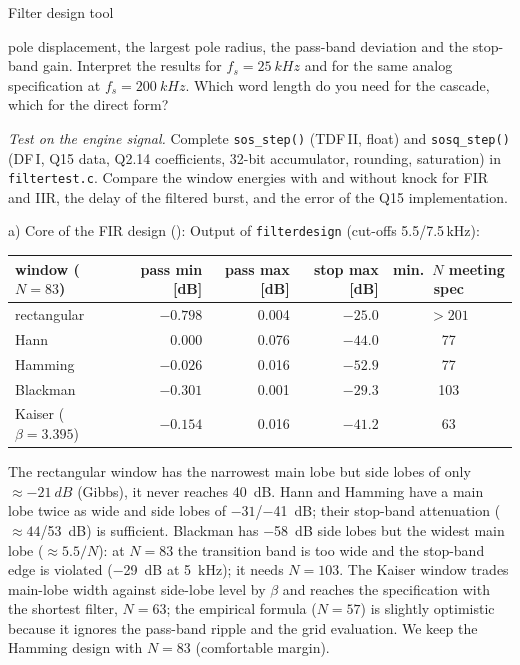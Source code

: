 \begin{exercise}{Filter design tool}{\JSLinux}
\begin{tasks}
    pole displacement, the largest pole radius, the pass-band deviation and the
    stop-band gain. Interpret the results for $f_s=\SI{25}{kHz}$ and for the
    same analog specification at $f_s=\SI{200}{kHz}$. Which word length do you
    need for the cascade, which for the direct form?
  \item \emph{Test on the engine signal.} Complete \texttt{sos\_step()} (TDF\,II,
    float) and \texttt{sosq\_step()} (DF\,I, Q15 data, Q2.14 coefficients, 32-bit
    accumulator, rounding, saturation) in \texttt{filtertest.c}. Compare the
    window energies with and without knock for FIR and IIR, the delay of the
    filtered burst, and the error of the Q15 implementation.
\end{tasks}
\end{exercise}

\begin{solution}
a) Core of the FIR design ():
Output of \texttt{filterdesign} (cut-offs 5.5/7.5\,kHz):
\begin{center}
\small
\begin{tabular}{@{}lrrrc@{}}
\toprule
window ($N=83$) & pass min [dB] & pass max [dB] & stop max [dB] & min.\ $N$ meeting spec\\
\midrule
rectangular & $-0.798$ & 0.004 & $-25.0$ & $>201$\\
Hann        & 0.000 & 0.076 & $-44.0$ & 77\\
Hamming     & $-0.026$ & 0.016 & $-52.9$ & 77\\
Blackman    & $-0.301$ & 0.001 & $-29.3$ & 103\\
Kaiser ($\beta=3.395$) & $-0.154$ & 0.016 & $-41.2$ & 63\\
\bottomrule
\end{tabular}
\end{center}
The rectangular window has the narrowest main lobe but side lobes of only
$\approx\SI{-21}{dB}$ (Gibbs), it never reaches \SI{40}{dB}. Hann and Hamming
have a main lobe twice as wide and side lobes of $-31$/\SI{-41}{dB}; their
stop-band attenuation ($\approx 44$/\SI{53}{dB}) is sufficient. Blackman has
\SI{-58}{dB} side lobes but the widest main lobe ($\approx5.5/N$): at $N=83$ the
transition band is too wide and the stop-band edge is violated (\SI{-29}{dB}
at \SI{5}{kHz}); it needs $N=103$. The Kaiser window trades main-lobe width
against side-lobe level by $\beta$ and reaches the specification with the
shortest filter, $N=63$; the empirical formula ($N=57$) is slightly optimistic
because it ignores the pass-band ripple and the grid evaluation. We keep
the Hamming design with $N=83$ (comfortable margin).


\end{solution}
